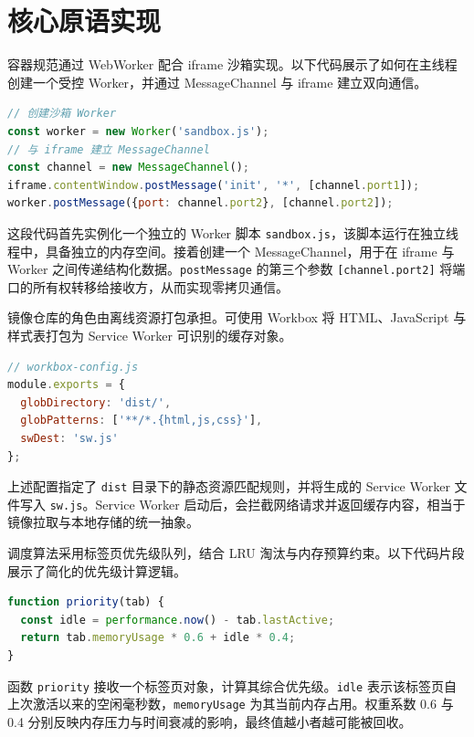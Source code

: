 \chapter{核心原语实现}
容器规范通过 WebWorker 配合 iframe 沙箱实现。以下代码展示了如何在主线程创建一个受控 Worker，并通过 MessageChannel 与 iframe 建立双向通信。\par
\begin{lstlisting}[language=js]
// 创建沙箱 Worker
const worker = new Worker('sandbox.js');
// 与 iframe 建立 MessageChannel
const channel = new MessageChannel();
iframe.contentWindow.postMessage('init', '*', [channel.port1]);
worker.postMessage({port: channel.port2}, [channel.port2]);
\end{lstlisting}
这段代码首先实例化一个独立的 Worker 脚本 \texttt{sandbox.js}，该脚本运行在独立线程中，具备独立的内存空间。接着创建一个 MessageChannel，用于在 iframe 与 Worker 之间传递结构化数据。\texttt{postMessage} 的第三个参数 \texttt{[channel.port2]} 将端口的所有权转移给接收方，从而实现零拷贝通信。\par
镜像仓库的角色由离线资源打包承担。可使用 Workbox 将 HTML、JavaScript 与样式表打包为 Service Worker 可识别的缓存对象。\par
\begin{lstlisting}[language=js]
// workbox-config.js
module.exports = {
  globDirectory: 'dist/',
  globPatterns: ['**/*.{html,js,css}'],
  swDest: 'sw.js'
};
\end{lstlisting}
上述配置指定了 \texttt{dist} 目录下的静态资源匹配规则，并将生成的 Service Worker 文件写入 \texttt{sw.js}。Service Worker 启动后，会拦截网络请求并返回缓存内容，相当于镜像拉取与本地存储的统一抽象。\par
调度算法采用标签页优先级队列，结合 LRU 淘汰与内存预算约束。以下代码片段展示了简化的优先级计算逻辑。\par
\begin{lstlisting}[language=js]
function priority(tab) {
  const idle = performance.now() - tab.lastActive;
  return tab.memoryUsage * 0.6 + idle * 0.4;
}
\end{lstlisting}
函数 \texttt{priority} 接收一个标签页对象，计算其综合优先级。\texttt{idle} 表示该标签页自上次激活以来的空闲毫秒数，\texttt{memoryUsage} 为其当前内存占用。权重系数 0.6 与 0.4 分别反映内存压力与时间衰减的影响，最终值越小者越可能被回收。\par
